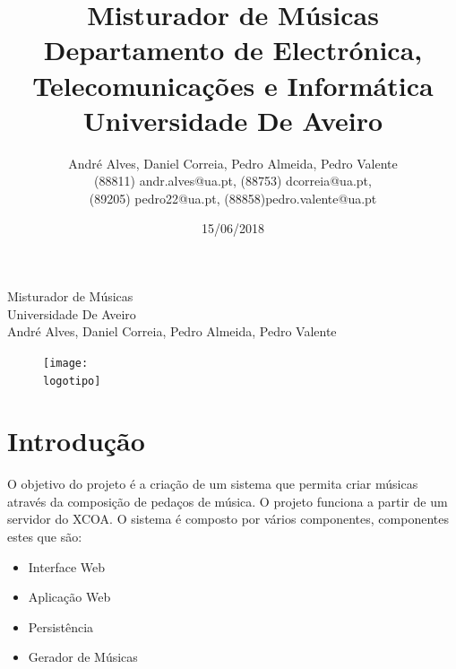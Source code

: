 \documentclass{report}
\begin{document}
%
\def\titulo{Misturador de Músicas}
\def\data{15/06/2018}
\def\autores{André Alves, Daniel Correia, Pedro Almeida, Pedro Valente}
\def\autorescontactos{(88811) andr.alves@ua.pt, (88753) dcorreia@ua.pt,\\
 (89205) pedro22@ua.pt, (88858)pedro.valente@ua.pt}
\def\departamento{Departamento de Electrónica, Telecomunicações e Informática}
\def\empresa{Universidade De Aveiro}
\def\logotipo{img/ua.pdf}
%

%
\begin{titlepage}

\begin{center}
%
\vspace*{50mm}
%
{\Huge \titulo}\\ 
%
\vspace{10mm}
%
{\Large \empresa}\\
%
\vspace{10mm}
%
{\LARGE \autores}\\ 
%
\vspace{30mm}
%
\begin{figure}[h]
\center
\texttt{[image: \\logotipo]}
\end{figure}
%
\vspace{30mm}
\end{center}
%

\end{titlepage}

\title{%
{\Huge\textbf{\titulo}}\\
{\Large \departamento\\ \empresa}
}
%
\author{%
    \autores \\
    \autorescontactos
}
%
\date{\data}
%
\maketitle



\tableofcontents
\listoffigures    %



\chapter{Introdução}
\label{chap.introducao}
O objetivo do projeto é a criação de um sistema que permita criar músicas através da
composição de pedaços de música. O projeto funciona a partir de um servidor do XCOA.
O sistema é composto por vários componentes, componentes estes que são:
\begin{itemize}
	\item Interface Web
	\item Aplicação Web
	\item Persistência
	\item Gerador de Músicas
\end{itemize}	
\end{document}
